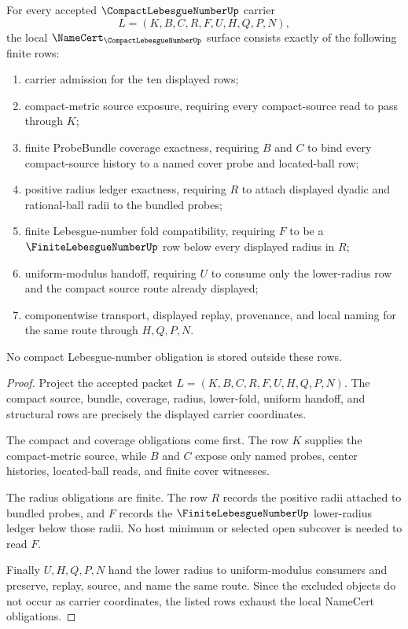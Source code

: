 \begin{theorem}
\label{thm:compact-lebesgue-number-namecert-obligations}
For every accepted $\CompactLebesgueNumberUp$ carrier
$$
L=(K,B,C,R,F,U,H,Q,P,N),
$$
the local $\NameCert_{\CompactLebesgueNumberUp}$ surface consists exactly of the following finite rows:
\begin{enumerate}
\item carrier admission for the ten displayed rows;
\item compact-metric source exposure, requiring every compact-source read to pass through $K$;
\item finite ProbeBundle coverage exactness, requiring $B$ and $C$ to bind every compact-source history to a named cover probe and located-ball row;
\item positive radius ledger exactness, requiring $R$ to attach displayed dyadic and rational-ball radii to the bundled probes;
\item finite Lebesgue-number fold compatibility, requiring $F$ to be a $\FiniteLebesgueNumberUp$ row below every displayed radius in $R$;
\item uniform-modulus handoff, requiring $U$ to consume only the lower-radius row and the compact source route already displayed;
\item componentwise transport, displayed replay, provenance, and local naming for the same route through $H,Q,P,N$.
\end{enumerate}
No compact Lebesgue-number obligation is stored outside these rows.
\end{theorem}
\begin{proof}
Project the accepted packet $L=(K,B,C,R,F,U,H,Q,P,N)$. The compact source, bundle, coverage, radius, lower-fold, uniform handoff, and structural rows are precisely the displayed carrier coordinates.

The compact and coverage obligations come first. The row $K$ supplies the compact-metric source, while $B$ and $C$ expose only named probes, center histories, located-ball reads, and finite cover witnesses.

The radius obligations are finite. The row $R$ records the positive radii attached to bundled probes, and $F$ records the $\FiniteLebesgueNumberUp$ lower-radius ledger below those radii. No host minimum or selected open subcover is needed to read $F$.

Finally $U,H,Q,P,N$ hand the lower radius to uniform-modulus consumers and preserve, replay, source, and name the same route. Since the excluded objects do not occur as carrier coordinates, the listed rows exhaust the local NameCert obligations.
\end{proof}

